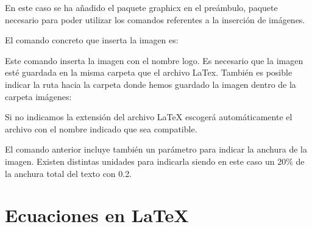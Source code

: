 \documentclass[11pt, a4paper]{article}
\begin{document}















En este caso se ha añadido el paquete graphicx en el preámbulo, paquete necesario para poder utilizar los comandos referentes a la inserción de imágenes.

El comando concreto que inserta la imagen es:  


Este comando inserta la imagen con el nombre logo. Es necesario que la imagen esté guardada en la misma carpeta que el archivo LaTex. También es posible indicar la ruta hacia la carpeta donde hemos guardado la imagen dentro de la carpeta imágenes:


Si no indicamos la extensión del archivo LaTeX escogerá automáticamente el archivo con el nombre indicado que sea compatible.

El comando anterior incluye también un parámetro para indicar la anchura de la imagen. Existen distintas unidades para indicarla siendo en este caso un 20\% de la anchura total del texto con 0.2.

\section{Ecuaciones en LaTeX}
\end{document}
